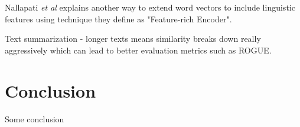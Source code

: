\documentclass[journal]{IEEEtran}
\begin{document}
Nallapati \emph{et al}\cite{featurerich} explains another way to extend word vectors to include linguistic features using technique they define as "Feature-rich Encoder". 

Text summarization - longer texts means similarity breaks down really aggressively which can lead to better evaluation metrics such as ROGUE. 

\section{Conclusion}


Some conclusion






%


\end{document}
